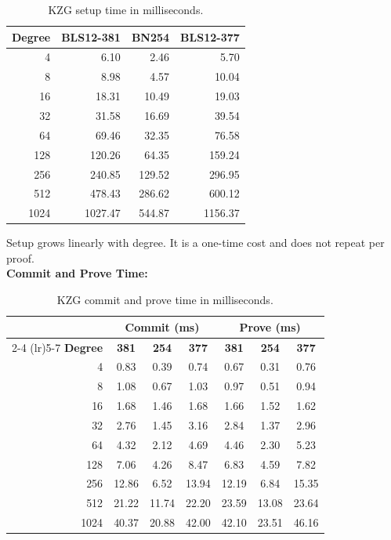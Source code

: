 \begin{table}[H]
\centering
\caption{KZG setup time in milliseconds.}
\label{tab:kzg-setup}
\begin{tabular}{rrrr}
\toprule
\textbf{Degree} & \textbf{BLS12-381} & \textbf{BN254} & \textbf{BLS12-377} \\
\midrule
4    & 6.10    & 2.46   & 5.70    \\
8    & 8.98    & 4.57   & 10.04   \\
16   & 18.31   & 10.49  & 19.03   \\
32   & 31.58   & 16.69  & 39.54   \\
64   & 69.46   & 32.35  & 76.58   \\
128  & 120.26  & 64.35  & 159.24  \\
256  & 240.85  & 129.52 & 296.95  \\
512  & 478.43  & 286.62 & 600.12  \\
1024 & 1027.47 & 544.87 & 1156.37 \\
\bottomrule
\end{tabular}
\end{table}

Setup grows linearly with degree. It is a one-time cost and does not
repeat per proof.
\\
\textbf{Commit and Prove Time:}

\begin{table}[H]
\centering
\caption{KZG commit and prove time in milliseconds.}
\label{tab:kzg-commit-prove}
\begin{tabular}{rcccccc}
\toprule
& \multicolumn{3}{c}{\textbf{Commit (ms)}} & \multicolumn{3}{c}{\textbf{Prove (ms)}} \\
\cmidrule(lr){2-4} \cmidrule(lr){5-7}
\textbf{Degree} & \textbf{381} & \textbf{254} & \textbf{377}
                & \textbf{381} & \textbf{254} & \textbf{377} \\
\midrule
4    & 0.83  & 0.39  & 0.74  & 0.67  & 0.31  & 0.76  \\
8    & 1.08  & 0.67  & 1.03  & 0.97  & 0.51  & 0.94  \\
16   & 1.68  & 1.46  & 1.68  & 1.66  & 1.52  & 1.62  \\
32   & 2.76  & 1.45  & 3.16  & 2.84  & 1.37  & 2.96  \\
64   & 4.32  & 2.12  & 4.69  & 4.46  & 2.30  & 5.23  \\
128  & 7.06  & 4.26  & 8.47  & 6.83  & 4.59  & 7.82  \\
256  & 12.86 & 6.52  & 13.94 & 12.19 & 6.84  & 15.35 \\
512  & 21.22 & 11.74 & 22.20 & 23.59 & 13.08 & 23.64 \\
1024 & 40.37 & 20.88 & 42.00 & 42.10 & 23.51 & 46.16 \\
\bottomrule
\end{tabular}
\end{table}

